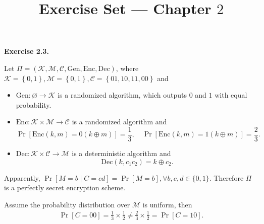 \documentclass[a4paper]{article}
\title{Exercise Set --- Chapter $2$}
\date{}
\newenvironment{exercise}[1]{
	\par
	\noindent\textbf{Exercise #1.}\quad
}{
	\par
	\bigskip
}
\newcommand{\cbra}[1]{\left\{ #1 \right\}}
\newcommand{\sbra}[1]{\left[ #1 \right]}
\begin{document}
\maketitle

\begin{exercise}{2.3}
    Let $\Pi=(\mathcal K,\mathcal M,\mathcal C,\mathrm{Gen},\mathrm{Enc},\mathrm{Dec})$, where
    $\mathcal K=\cbra{0,1},\mathcal M=\cbra{0,1},\mathcal C=\cbra{01,10,11,00}$ and
    \begin{itemize}
        \item $\mathrm{Gen}:\varnothing\to\mathcal K$ is a randomized algorithm, 
            which outputs $0$ and $1$ with equal probability.
        \item $\mathrm{Enc}:\mathcal K\times\mathcal M\to\mathcal C$ is a randomized algorithm and
            $$
            \Pr\sbra{\mathrm{Enc}(k,m)=0(k\oplus m)}=\frac13,\quad
            \Pr\sbra{\mathrm{Enc}(k,m)=1(k\oplus m)}=\frac23.
            $$
        \item $\mathrm{Dec}:\mathcal K\times\mathcal C\to\mathcal M$ is a deterministic algorithm and
            $$
            \mathrm{Dec}(k,c_1c_2)=k\oplus c_2.
            $$
    \end{itemize}
    Apparently, $\Pr\sbra{M=b\mid C=cd}=\Pr\sbra{M=b},\forall b,c,d\in\{0,1\}$. 
    Therefore $\Pi$ is a perfectly secret encryption scheme.\par
    Assume the probability distribution over $\mathcal M$ is uniform, then
    \begin{align*}
        \Pr\sbra{C=00}=\frac13\times\frac12\neq\frac23\times\frac12=\Pr\sbra{C=10}.
    \end{align*}
\end{exercise}
\end{document}
